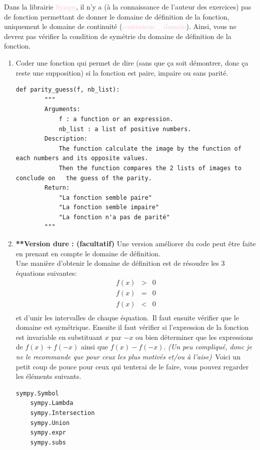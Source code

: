 \documentclass[11pt, french]{article}
\newcommand{\inlsnippet}[1]{\colorbox{gray!10}{\mbox{\textcolor{pink}{#1}}}}
\begin{document}
Dans la librairie \inlsnippet{Sympy}, il n'y a (à la connaissance de l'auteur des exercices) pas de fonction permettant de donner le domaine de définition de la fonction, uniquement le domaine de continuité (\inlsnippet{continuous\_ domain}).
Ainsi, vous ne devrez pas vérifier la condition de symétrie du domaine de définition de la fonction.

\begin{enumerate}
    \item Coder une fonction qui permet de dire (sans que ça soit démontrer, donc ça reste une supposition) si la fonction est paire, impaire ou sans parité.
    \begin{lstlisting}[style=nightly]
    def parity_guess(f, nb_list):
        """
        Arguments:
            f : a function or an expression.
            nb_list : a list of positive numbers.
        Description:
            The function calculate the image by the function of each numbers and its opposite values.
            Then the function compares the 2 lists of images to conclude on   the guess of the parity.
        Return:
            "La fonction semble paire"
            "La fonction semble impaire"
            "La fonction n'a pas de parité"
        """
    \end{lstlisting}
    \item \textbf{**Version dure : (facultatif)}
    Une version améliorer du code peut être faite en prenant en compte le domaine de définition.\\
    Une manière d'obtenir le domaine de définition est de résoudre les 3 équations suivantes:
    \begin{equation*}
    \begin{matrix}
        f(x) & > & 0 \\
        f(x) & = & 0 \\
        f(x) & < & 0 \\
    \end{matrix}
    \end{equation*}
    et d'unir les intervalles de chaque équation.\
    Il faut ensuite vérifier que le domaine est symétrique.
    Ensuite il faut vérifier si l'expression de la fonction est invariable en substituant $x$ par $-x$ ou bien déterminer que les expressions de $f(x) +f(-x)$ ainsi que $f(x) - f(-x)$.
    \textit{(Un peu compliqué, donc je ne le recommande que pour ceux les plus motivés et/ou à l'aise)}\
    Voici un petit coup de pouce pour ceux qui tenterai de le faire, vous pouvez regarder les éléments suivants.
   \begin{lstlisting}[style=nightly]
    sympy.Symbol
    sympy.Lambda
    sympy.Intersection
    sympy.Union
    sympy.expr
    sympy.subs
   \end{lstlisting}
\end{enumerate}
\vspace{2cm}
\end{document}
